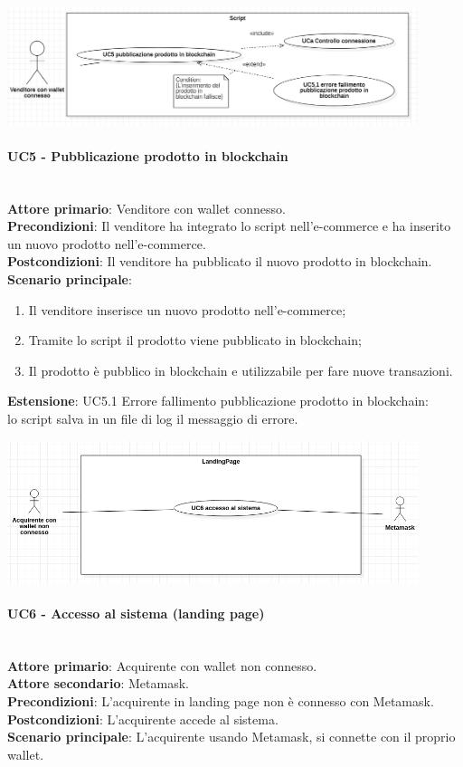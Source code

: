 \documentclass[a4paper, 12pt]{article}
\begin{document}
\includegraphics[width=0.9\textwidth]{UC_script}

\paragraph{UC5 - Pubblicazione prodotto in blockchain}\\
\textbf{Attore primario}: Venditore con wallet connesso.\\
\textbf{Precondizioni}: Il venditore ha integrato lo script nell'e-commerce e ha inserito un nuovo prodotto nell'e-commerce.\\
\textbf{Postcondizioni}: Il venditore ha pubblicato il nuovo prodotto in blockchain.\\
\textbf{Scenario principale}:
\begin{enumerate}
    \item Il venditore inserisce un nuovo prodotto nell'e-commerce;
    \item Tramite lo script il prodotto viene pubblicato in blockchain;
    \item Il prodotto è pubblico in blockchain e utilizzabile per fare nuove transazioni.
\end{enumerate}
\textbf{Estensione}:
UC5.1 Errore fallimento pubblicazione prodotto in blockchain:\\
lo script salva in un file di log il messaggio di errore.


\includegraphics[width=0.9\textwidth]{UC_LP1}

\paragraph{UC6 - Accesso al sistema (landing page)}\\
\textbf{Attore primario}: Acquirente con wallet non connesso.\\
\textbf{Attore secondario}: Metamask.\\
\textbf{Precondizioni}: L'acquirente in landing page non è connesso con Metamask.\\
\textbf{Postcondizioni}: L'acquirente accede al sistema.\\
\textbf{Scenario principale}:
L'acquirente usando Metamask, si connette con il proprio wallet.
\end{document}
